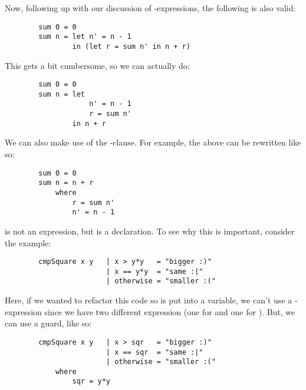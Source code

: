 \documentclass[letterpaper]{article}
\begin{document}
\begin{itemize}
    \bigskip 

    Now, following up with our discussion of -expressions, the following is also valid: 
    \begin{verbatim}
        sum 0 = 0
        sum n = let n' = n - 1
                in (let r = sum n' in n + r)\end{verbatim}
    This gets a bit cumbersome, so we can actually do: 
    \begin{verbatim}
        sum 0 = 0
        sum n = let
                    n' = n - 1
                    r = sum n'
                in n + r\end{verbatim}
    We can also make use of the -clause. For example, the above can be rewritten like so: 
    \begin{verbatim}
        sum 0 = 0
        sum n = n + r
            where 
                r = sum n' 
                n' = n - 1
    \end{verbatim}
     is not an expression, but is a declaration. To see why this is important, consider the  example: 
    \begin{verbatim}
        cmpSquare x y   | x > y*y   = "bigger :)"
                        | x == y*y  = "same :|"
                        | otherwise = "smaller :("\end{verbatim}
    Here, if we wanted to refactor this code so  is put into a variable, we can't use a -expression since we have two different expression (one for  and one for ). But, we can use a guard, like so: 
    \begin{verbatim}
        cmpSquare x y   | x > sqr   = "bigger :)"
                        | x == sqr  = "same :|"
                        | otherwise = "smaller :("
            where
                sqr = y*y\end{verbatim}
\end{itemize}
\end{document}
